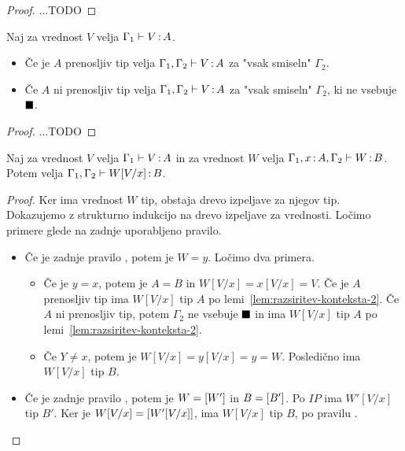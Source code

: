 \begin{proof}
	...TODO
\end{proof}

\begin{lema}\label{lem:razsiritev-konteksta-2}
	Naj za vrednost $V$ velja $\Gamma_1 \vdash V \mathinner{:} A$.
	\begin{itemize}
		\item Če je $A$ prenosljiv tip velja $\Gamma_1, \Gamma_2 \vdash V \mathinner{:} A$ za "vsak smiseln" $\Gamma_2$.
		\item Če $A$ ni prenosljiv tip velja $\Gamma_1, \Gamma_2 \vdash V \mathinner{:} A$ za "vsak smiseln" $\Gamma_2$, ki ne vsebuje $\blacksquare$.
	\end{itemize}
\end{lema}

\begin{proof}
	...TODO
\end{proof}

\begin{lema}\label{lem:substitucija-vrednosti-2}
	Naj za vrednost $V$ velja $\Gamma_1 \vdash V \mathinner{:} A$ in za vrednost $W$ velja $\Gamma_1, x \mathinner{:} A, \Gamma_2 \vdash W \mathinner{:} B$. Potem velja $\Gamma_1, \Gamma_2 \vdash W[V/x] \mathinner{:} B$.
\end{lema}

\begin{proof}
	Ker ima vrednost $W$ tip, obstaja drevo izpeljave za njegov tip.
	Dokazujemo z strukturno indukcijo na drevo izpeljave za vrednosti.
	Ločimo primere glede na zadnje uporabljeno pravilo.
	
	\begin{itemize}
		\item Če je zadnje pravilo , potem je $W = y$.
		Ločimo dva primera.
		\begin{itemize}
			\item Če je $y = x$, potem je $A = B$ in $W[V/x] = x[V/x] = V$. Če je $A$ prenosljiv tip ima $W[V/x]$ tip $A$ po lemi~\ref{lem:razsiritev-konteksta-2}. Če $A$ ni prenosljiv tip, potem $\Gamma_2$ ne vsebuje $\blacksquare$ in ima $W[V/x]$ tip $A$ po lemi~\ref{lem:razsiritev-konteksta-2}.
			
			\item Če $Y \neq x$, potem je $W[V/x] = y[V/x] = y = W$. Posledično ima $W[V/x]$ tip $B$.
		\end{itemize}
		
		\item Če je zadnje pravilo , potem je $W=[W']$ in $B=[B']$. Po $IP$ ima $W'[V/x]$ tip $B'$. Ker je $W[V/x] = [W'[V/x]]$, ima $W[V/x]$ tip $B$, po pravilu .
		
	\end{itemize}
\end{proof}

